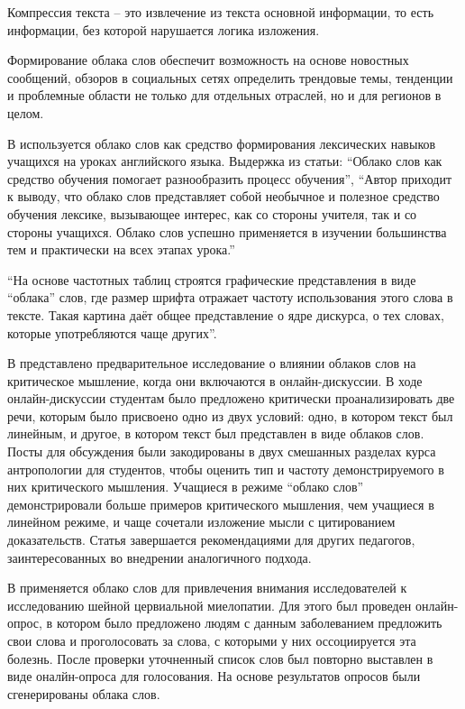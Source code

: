 \documentclass[bachelor, och, coursework ]{SCWorks}
\begin{document}
Компрессия текста – это извлечение из текста основной информации, то есть информации, без которой нарушается логика изложения.


  Формирование облака слов обеспечит возможность на основе новостных сообщений, обзоров в социальных сетях определить трендовые темы, тенденции и проблемные области не только для отдельных отраслей, но и для регионов в целом. 

В \cite{2} используется облако слов как средство формирования лексических навыков учащихся на уроках английского языка. Выдержка из статьи: “Облако слов как средство обучения помогает разнообразить процесс обучения”, “Автор приходит к выводу, что облако слов представляет собой необычное и полезное средство обучения лексике, вызывающее интерес, как со стороны учителя, так и со стороны учащихся. Облако слов успешно применяется в изучении большинства тем и практически на всех этапах урока.” 

“На основе частотных таблиц строятся графические представления в виде “облака” слов, где размер шрифта отражает частоту использования этого слова в тексте. Такая картина даёт общее представление о ядре дискурса, о тех словах, которые употребляются чаще других”\cite{3}.  


 В \cite{4} представлено предварительное исследование о влиянии облаков слов на критическое мышление, когда они включаются в онлайн-дискуссии. В ходе онлайн-дискуссии студентам было предложено критически проанализировать две речи, которым было присвоено одно из двух условий: одно, в котором текст был линейным, и другое, в котором текст был представлен в виде облаков слов. Посты для обсуждения были закодированы в двух смешанных разделах курса антропологии для студентов, чтобы оценить тип и частоту демонстрируемого в них критического мышления. Учащиеся в режиме “облако слов” демонстрировали больше примеров критического мышления, чем учащиеся в линейном режиме, и чаще сочетали изложение мысли с цитированием доказательств. Статья завершается рекомендациями для других педагогов, заинтересованных во внедрении аналогичного подхода.

В \cite{5} применяется облако слов для привлечения внимания исследователей к исследованию шейной цервиальной миелопатии. Для этого был проведен онлайн-опрос, в котором было предложено людям с данным заболеванием предложить свои слова и проголосовать за слова, с которыми у них оссоциируется эта болезнь. После проверки уточненный список слов был повторно выставлен в виде оналйн-опроса для голосования. На основе результатов опросов были сгенерированы облака слов.
\end{document}
